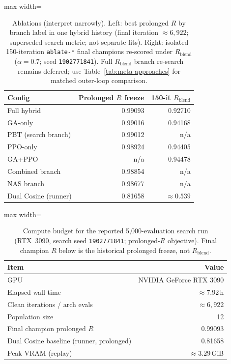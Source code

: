 \begin{table}[htbp]
  \centering
  \caption{Ablations (interpret narrowly).
    Left: best prolonged $R$ by branch label in one hybrid history (final iteration ${\approx}6{,}922$; superseded search metric; not separate fits).
    Right: isolated 150-iteration \texttt{ablate-*} final champions re-scored under $R_{\mathrm{blend}}$ ($\alpha{=}0.7$; seed \texttt{1902771841}).
    Full $R_{\mathrm{blend}}$ branch re-search remains deferred; use Table~\ref{tab:meta-approaches} for matched outer-loop comparison.}
  \label{tab:ablation}
  \setlength{\tabcolsep}{3pt}
  \begin{adjustbox}{max width=\columnwidth}
  \begin{tabular}{@{}lrr@{}}
    \toprule
    Config & Prolonged $R$ freeze & 150-it $R_{\mathrm{blend}}$ \\
    \midrule
    Full hybrid & 0.99093 & 0.92710 \\
    GA-only & 0.99016 & 0.94168 \\
    PBT (search branch) & 0.99012 & n/a \\
    PPO-only & 0.98924 & 0.94405 \\
    GA+PPO & n/a & 0.94478 \\
    Combined branch & 0.98854 & n/a \\
    NAS branch & 0.98677 & n/a \\
    Dual Cosine (runner) & 0.81658 & ${\approx}0.539$ \\
    \bottomrule
  \end{tabular}
\end{adjustbox}
\end{table}

\begin{table}[htbp]
  \centering
  \caption{Compute budget for the reported 5,000-evaluation search run (RTX~3090, search seed \texttt{1902771841}; prolonged-$R$ objective).
    Final champion $R$ below is the historical prolonged freeze, not $R_{\mathrm{blend}}$.}
  \label{tab:compute}
  \setlength{\tabcolsep}{3pt}
  \begin{adjustbox}{max width=\columnwidth}
\begin{tabular}{@{}lr@{}}
    \toprule
    Item & Value \\
    \midrule
    GPU & NVIDIA GeForce RTX 3090 \\
    Elapsed wall time & ${\approx}7.92$\,h \\
    Clean iterations / arch evals & ${\approx}6{,}922$ \\
    Population size & 12 \\
    Final champion prolonged $R$ & 0.99093 \\
    Dual Cosine baseline (runner, prolonged) & 0.81658 \\
    Peak VRAM (replay) & ${\approx}3.29$\,GiB \\
    \bottomrule
  \end{tabular}
\end{adjustbox}
\end{table}

